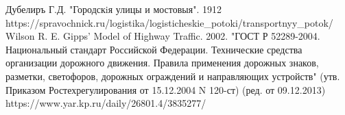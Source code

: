 \documentclass[12pt, a4paper]{extarticle}
\numberwithin{equation}{section}
\begin{document}
\newpage

\begin{thebibliography}{**}
	Дубелиръ Г.Д. "Городскiя улицы и мостовыя". 1912
	https://spravochnick.ru/logistika/logisticheskie\_potoki/transportnyy\_potok/
	Wilson R. E. Gipps’ Model of Highway Traffic. 2002.
	"ГОСТ Р 52289-2004. Национальный стандарт Российской Федерации. Технические средства организации дорожного движения. Правила применения дорожных знаков, разметки, светофоров, дорожных ограждений и направляющих устройств" (утв. Приказом Ростехрегулирования от 15.12.2004 N 120-ст) (ред. от 09.12.2013)
	https://www.yar.kp.ru/daily/26801.4/3835277/
\end{thebibliography}
\end{document}
